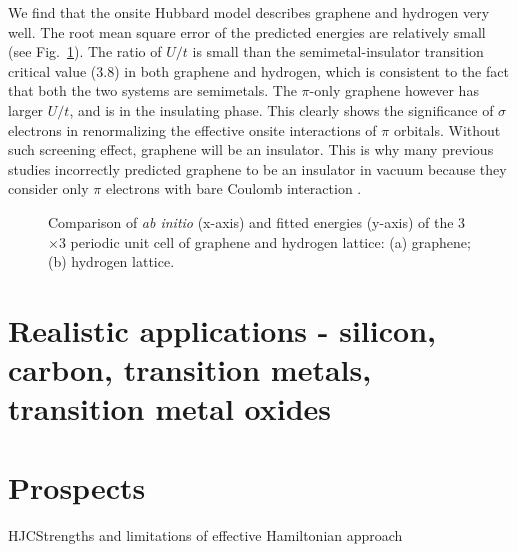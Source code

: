 \documentclass[prl,12pt,onecolumn,nofootinbib,notitlepage,english,superscriptaddress]{revtex4-1}
\newcommand{\HJC}[1]{{\color{RED}{\bf HJC: #1}}}
\begin{document}
We find that the onsite Hubbard model describes graphene and hydrogen very well. The root mean square error of the predicted energies are relatively small (see Fig.~\ref{fig:ne_aidmd_gh}). The ratio of $U/t$ is small than the semimetal-insulator transition critical value (3.8) in both graphene and hydrogen, which is consistent to the fact that both the two systems are semimetals.  The $\pi$-only graphene however has larger $U/t$, and is in the insulating phase. This clearly shows the significance of $\sigma$ electrons in renormalizing the effective onsite interactions of $\pi$ orbitals. Without such screening effect, graphene will be an insulator. This is why many previous studies incorrectly predicted graphene to be an insulator in vacuum because they consider only $\pi$ electrons with bare Coulomb interaction \cite{DrutPRL2009, DrutPRB2009,  Smith2014}.
\begin{figure}[htb]
\centering
{}
\caption{Comparison of \textit{ab initio} (x-axis) and fitted energies (y-axis) of the 3$\times$3 periodic unit cell of graphene and hydrogen lattice: (a) graphene; (b) hydrogen lattice.}\label{fig:ne_aidmd_gh}
\end{figure}



\section{Realistic applications - silicon, carbon, transition metals, transition metal oxides}

\section{Prospects}
\HJC{The need for including spin-orbit terms, need for QMC for this case}
\HJC{Other areas: Magnetism, small energy scales}
\HJC{Applications to non QMC methods - coupled cluster, FCI, HCI}
HJC{Strengths and limitations of effective Hamiltonian approach}



\end{document}
